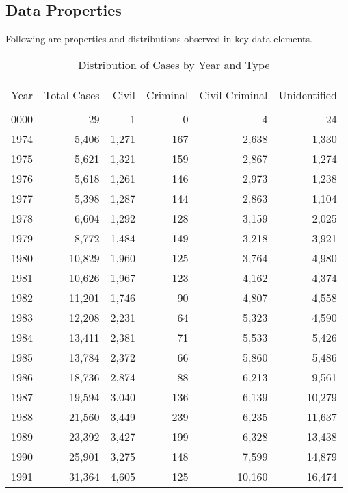 \documentclass[10pt, letterpaper]{article}
\begin{document}
\begin{spacing}{1.0}
\section{Data Properties}

Following are properties and distributions observed in key data elements.\\[12pt]

\begin{table}[h!]
    \small
    \centering
    \caption{Distribution of Cases by Year and Type}
    \begin{tabular}{rrrrrr}
        \hline\\[-8pt]
        Year & Total Cases & Civil & Criminal & Civil-Criminal & Unidentified\\[2pt]
        \hline\\[-6pt]
        0000 & 29 &  1 &  0 &  4 & 24\\
        1974 & 5,406 & 1,271 &   167 & 2,638 & 1,330\\
        1975 & 5,621 & 1,321 &   159 & 2,867 & 1,274\\
        1976 & 5,618 & 1,261 &   146 & 2,973 & 1,238\\
        1977 & 5,398 & 1,287 &   144 & 2,863 & 1,104\\
        1978 & 6,604 & 1,292 &   128 & 3,159 & 2,025\\
        1979 & 8,772 & 1,484 &   149 & 3,218 & 3,921\\
        1980 & 10,829 &  1,960 &    125 &  3,764 &  4,980\\
        1981 & 10,626 &  1,967 &    123 &  4,162 &  4,374\\
        1982 & 11,201 &  1,746 &     90 &  4,807 &  4,558\\
        1983 & 12,208 &  2,231 &     64 &  5,323 &  4,590\\
        1984 & 13,411 &  2,381 &     71 &  5,533 &  5,426\\
        1985 & 13,784 &  2,372 &     66 &  5,860 &  5,486\\
        1986 & 18,736 &  2,874 &     88 &  6,213 &  9,561\\
        1987 & 19,594 &  3,040 &    136 &  6,139 & 10,279\\
        1988 & 21,560 &  3,449 &    239 &  6,235 & 11,637\\
        1989 & 23,392 &  3,427 &    199 &  6,328 & 13,438\\
        1990 & 25,901 &  3,275 &    148 &  7,599 & 14,879\\
        1991 & 31,364 &  4,605 &    125 & 10,160 & 16,474\\

\end{tabular}
\end{table}
\end{spacing}
\end{document}

